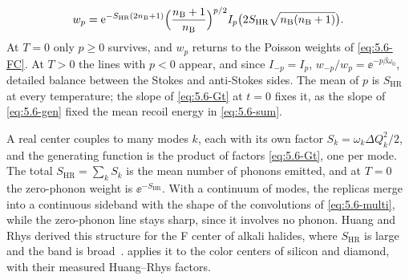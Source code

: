 \begin{equation}
  w_p = \mathrm{e}^{-S_{\mathrm{HR}}(2n_{\mathrm{B}} + 1)}\Bigl(\frac{n_{\mathrm{B}} + 1}{n_{\mathrm{B}}}\Bigr)^{p/2}I_p\bigl(2S_{\mathrm{HR}}\sqrt{n_{\mathrm{B}}(n_{\mathrm{B}} + 1)}\bigr) .
  \label{eq:5.6-bessel}
\end{equation}
At $T = 0$ only $p \ge 0$ survives, and $w_p$ returns to the Poisson weights of \cref{eq:5.6-FC}. At $T > 0$ the lines with $p < 0$ appear, and since $I_{-p} = I_p$, $w_{-p}/w_p = \ee^{-p\beta\omega_0}$, detailed balance between the Stokes and anti-Stokes sides. The mean of $p$ is $S_{\mathrm{HR}}$ at every temperature; the slope of \cref{eq:5.6-Gt} at $t = 0$ fixes it, as the slope of \cref{eq:5.6-gen} fixed the mean recoil energy in \cref{eq:5.6-sum}.

A real center couples to many modes $k$, each with its own factor $S_k = \omega_k\Delta Q_k^2/2$, and the generating function is the product of factors \cref{eq:5.6-Gt}, one per mode. The total $S_{\mathrm{HR}} = \sum_kS_k$ is the mean number of phonons emitted, and at $T = 0$ the zero-phonon weight is $\ee^{-S_{\mathrm{HR}}}$. With a continuum of modes, the replicas merge into a continuous sideband with the shape of the convolutions of \cref{eq:5.6-multi}, while the zero-phonon line stays sharp, since it involves no phonon. Huang and Rhys derived this structure for the F center of alkali halides, where $S_{\mathrm{HR}}$ is large and the band is broad~\cite{huang1950theory}.  applies it to the color centers of silicon and diamond, with their measured Huang--Rhys factors.

